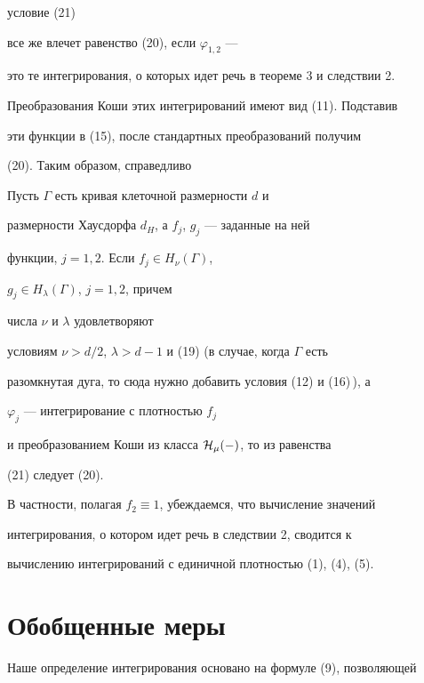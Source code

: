 условие (21) 


все же влечет равенство (20), если $\varphi_{1,2}$ --- 


это те интегрирования, о которых идет речь в теореме 3 и следствии 2. 


Преобразования Коши этих интегрирований имеют вид (11). Подставив 


эти функции в (15), после стандартных преобразований получим 


(20). Таким образом, справедливо 


 


\begin{cor} 


Пусть $\Gamma$ есть кривая клеточной размерности $d$ и 


размерности Хаусдорфа $d_H$, а $f_j$, $g_j$ --- заданные на ней 


функции, $j=1,2$. Если $f_j\in H_\nu(\Gamma)$, 


$g_j\in H_\lambda(\Gamma)$, $j=1,2$, причем 


числа $\nu$ и $\lambda$ удовлетворяют 


условиям $\nu>d/2$, $\lambda>d-1$ и (19) (в случае, когда $\Gamma$ есть 


разомкнутая дуга, то сюда нужно добавить условия (12) и (16)\,), а 


$\varphi_j$ --- интегрирование с плотностью $f_j$ 


и преобразованием Коши из класса $\cal H_\mu(\Gamma)$, то из равенства 


(21) следует (20). 


\end{cor} 


 


В частности, полагая $f_2\equiv 1$, убеждаемся, что вычисление значений 


интегрирования, о котором идет речь в следствии 2, сводится к 


вычислению интегрирований с единичной плотностью (1), (4), (5). 


 


\section{Обобщенные меры} 


 


Наше определение интегрирования основано на формуле (9), позволяющей 


